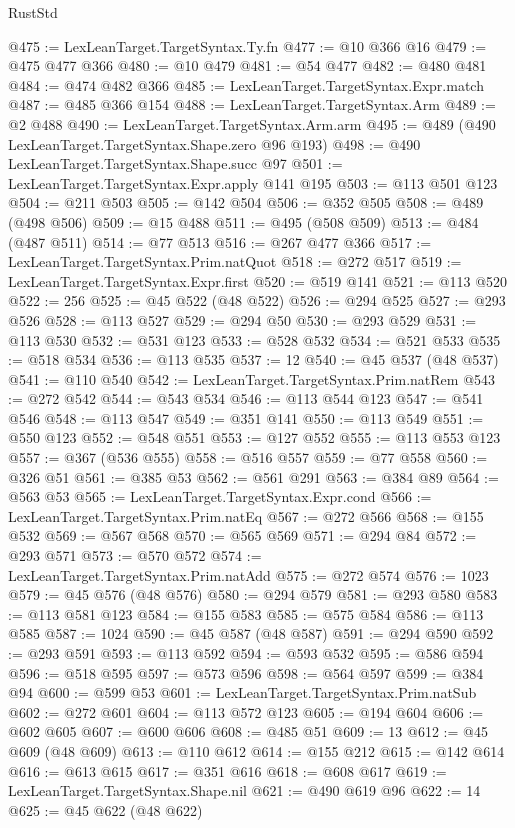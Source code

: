\begin{lexlean}{RustStd}
\begin{coremodule}
@475 := LexLeanTarget.TargetSyntax.Ty.fn
@477 := @10 @366 @16
@479 := @475 @477 @366
@480 := @10 @479
@481 := @54 @477
@482 := @480 @481
@484 := @474 @482 @366
@485 := LexLeanTarget.TargetSyntax.Expr.match
@487 := @485 @366 @154
@488 := LexLeanTarget.TargetSyntax.Arm
@489 := @2 @488
@490 := LexLeanTarget.TargetSyntax.Arm.arm
@495 := @489 (@490 LexLeanTarget.TargetSyntax.Shape.zero @96 @193)
@498 := @490 LexLeanTarget.TargetSyntax.Shape.succ @97
@501 := LexLeanTarget.TargetSyntax.Expr.apply @141 @195
@503 := @113 @501 @123
@504 := @211 @503
@505 := @142 @504
@506 := @352 @505
@508 := @489 (@498 @506)
@509 := @15 @488
@511 := @495 (@508 @509)
@513 := @484 (@487 @511)
@514 := @77 @513
@516 := @267 @477 @366
@517 := LexLeanTarget.TargetSyntax.Prim.natQuot
@518 := @272 @517
@519 := LexLeanTarget.TargetSyntax.Expr.first
@520 := @519 @141
@521 := @113 @520
@522 := 256
@525 := @45 @522 (@48 @522)
@526 := @294 @525
@527 := @293 @526
@528 := @113 @527
@529 := @294 @50
@530 := @293 @529
@531 := @113 @530
@532 := @531 @123
@533 := @528 @532
@534 := @521 @533
@535 := @518 @534
@536 := @113 @535
@537 := 12
@540 := @45 @537 (@48 @537)
@541 := @110 @540
@542 := LexLeanTarget.TargetSyntax.Prim.natRem
@543 := @272 @542
@544 := @543 @534
@546 := @113 @544 @123
@547 := @541 @546
@548 := @113 @547
@549 := @351 @141
@550 := @113 @549
@551 := @550 @123
@552 := @548 @551
@553 := @127 @552
@555 := @113 @553 @123
@557 := @367 (@536 @555)
@558 := @516 @557
@559 := @77 @558
@560 := @326 @51
@561 := @385 @53
@562 := @561 @291
@563 := @384 @89
@564 := @563 @53
@565 := LexLeanTarget.TargetSyntax.Expr.cond
@566 := LexLeanTarget.TargetSyntax.Prim.natEq
@567 := @272 @566
@568 := @155 @532
@569 := @567 @568
@570 := @565 @569
@571 := @294 @84
@572 := @293 @571
@573 := @570 @572
@574 := LexLeanTarget.TargetSyntax.Prim.natAdd
@575 := @272 @574
@576 := 1023
@579 := @45 @576 (@48 @576)
@580 := @294 @579
@581 := @293 @580
@583 := @113 @581 @123
@584 := @155 @583
@585 := @575 @584
@586 := @113 @585
@587 := 1024
@590 := @45 @587 (@48 @587)
@591 := @294 @590
@592 := @293 @591
@593 := @113 @592
@594 := @593 @532
@595 := @586 @594
@596 := @518 @595
@597 := @573 @596
@598 := @564 @597
@599 := @384 @94
@600 := @599 @53
@601 := LexLeanTarget.TargetSyntax.Prim.natSub
@602 := @272 @601
@604 := @113 @572 @123
@605 := @194 @604
@606 := @602 @605
@607 := @600 @606
@608 := @485 @51
@609 := 13
@612 := @45 @609 (@48 @609)
@613 := @110 @612
@614 := @155 @212
@615 := @142 @614
@616 := @613 @615
@617 := @351 @616
@618 := @608 @617
@619 := LexLeanTarget.TargetSyntax.Shape.nil
@621 := @490 @619 @96
@622 := 14
@625 := @45 @622 (@48 @622)

\end{coremodule}
\end{lexlean}

